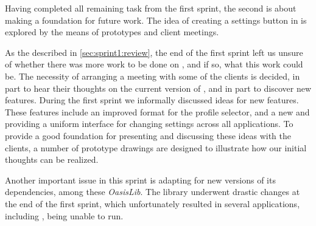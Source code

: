 Having completed all remaining task from the first sprint, the second is about making a foundation for future work.
The idea of creating a settings button in \launcher is explored by the means of prototypes and client meetings.

As the described in \cref{sec:sprint1:review}, the end of the first sprint left us unsure of whether there was more work to be done on \launcher, and if so, what this work could be. 
The necessity of arranging a meeting with some of the clients is decided, in part to hear their thoughts on the current version of \launcher, and in part to discover new features.
During the first sprint we informally discussed ideas for new features.
These features include an improved format for the profile selector, and a new \settingsactivity and providing a uniform interface for changing settings across all applications. 
To provide a good foundation for presenting and discussing these ideas with the clients, a number of prototype drawings are designed to illustrate how our initial thoughts can be realized.

Another important issue in this sprint is adapting \launcher for new versions of its dependencies, among these \textit{OasisLib}.
The library underwent drastic changes at the end of the first sprint, which unfortunately resulted in several applications, including \launcher, being unable to run.